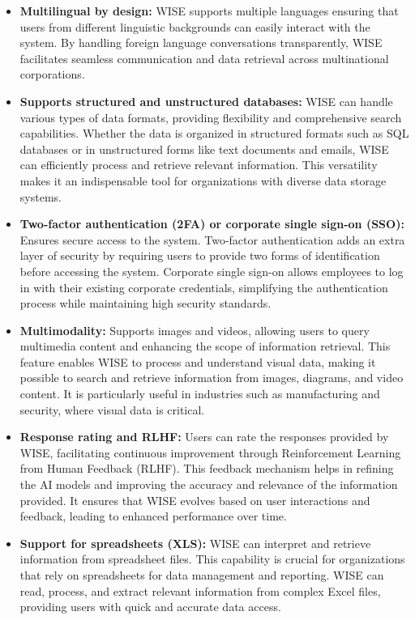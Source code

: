 \begin{itemize}
    \item \textbf{Multilingual by design:} WISE supports multiple languages ensuring that users from different linguistic backgrounds can easily interact with the system. By handling foreign language conversations transparently, WISE facilitates seamless communication and data retrieval across multinational corporations.
    
    \item \textbf{Supports structured and unstructured databases:} WISE can handle various types of data formats, providing flexibility and comprehensive search capabilities. Whether the data is organized in structured formats such as SQL databases or in unstructured forms like text documents and emails, WISE can efficiently process and retrieve relevant information. This versatility makes it an indispensable tool for organizations with diverse data storage systems.
    
    \item \textbf{Two-factor authentication (2FA) or corporate single sign-on (SSO):} Ensures secure access to the system. Two-factor authentication adds an extra layer of security by requiring users to provide two forms of identification before accessing the system. Corporate single sign-on allows employees to log in with their existing corporate credentials, simplifying the authentication process while maintaining high security standards.
    
    \item \textbf{Multimodality:} Supports images and videos, allowing users to query multimedia content and enhancing the scope of information retrieval. This feature enables WISE to process and understand visual data, making it possible to search and retrieve information from images, diagrams, and video content. It is particularly useful in industries such as manufacturing and security, where visual data is critical.
    
    \item \textbf{Response rating and RLHF:} Users can rate the responses provided by WISE, facilitating continuous improvement through Reinforcement Learning from Human Feedback (RLHF). This feedback mechanism helps in refining the AI models and improving the accuracy and relevance of the information provided. It ensures that WISE evolves based on user interactions and feedback, leading to enhanced performance over time.
    
    \item \textbf{Support for spreadsheets (XLS):} WISE can interpret and retrieve information from spreadsheet files. This capability is crucial for organizations that rely on spreadsheets for data management and reporting. WISE can read, process, and extract relevant information from complex Excel files, providing users with quick and accurate data access.
    

\end{itemize}
